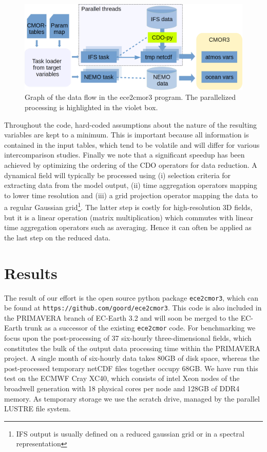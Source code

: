 \documentclass[procedia]{easychair}
\begin{document}
\begin{figure}[ht]
 \centering
 \includegraphics[width=\textwidth,clip]{ece2cmor3flowv3.png}
 \caption{Graph of the data flow in the ece2cmor3 program. The parallelized 
processing is highlighted in the violet box.}
\end{figure}

Throughout the code, hard-coded assumptions about the nature of the resulting 
variables are kept to a minimum. This is important because all information is 
contained in the input tables, which tend to be volatile and will differ for 
various intercomparison studies. Finally we note that a significant speedup has 
been achieved by optimizing the ordering of the CDO operators for data 
reduction. A dynamical field will typically be processed using (i) selection 
criteria for extracting data from the model output, (ii) time aggregation 
operators mapping to lower time resolution and (iii) a grid projection operator 
mapping the data to a regular Gaussian grid\footnote{IFS output is usually 
defined on a reduced gaussian grid or in a spectral representation}. The latter 
step is costly for high-resolution 3D fields, but it is a linear operation 
(matrix multiplication) which commutes with linear time aggregation operators 
such as averaging. Hence it can often be applied as the last step on the 
reduced data.

\section{Results}
The result of our effort is the open source python package \texttt{ece2cmor3}, 
which can be found at \texttt{https://github.com/goord/ece2cmor3}. This code is 
also included in the PRIMAVERA branch of EC-Earth 3.2 and will soon be merged 
to the EC-Earth trunk as a successor of the existing \texttt{ece2cmor} code. 
For benchmarking we focus upon the post-processing of 37 six-hourly 
three-dimensional fields, which constitutes the bulk of the output data 
processing time within the PRIMAVERA project. A single month of 
six-hourly data takes 80GB of disk space, whereas the post-processed temporary  
netCDF files together occupy 68GB. We have run this test on the ECMWF Cray XC40, 
which consists of intel Xeon nodes of the broadwell generation with 18 physical 
cores per node and 128GB of DDR4 memory. As temporary storage we use the scratch 
drive, managed by the parallel LUSTRE file system.
\end{document}

